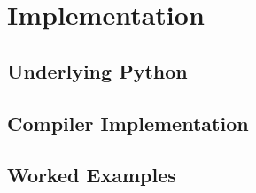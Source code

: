 \chapter{Implementation}\label{ch:ch2label}

\section{Underlying Python}\label{sec:underlying-python}


\section{Compiler Implementation}\label{sec:compiler-implementation}



\section{Worked Examples}\label{sec:worked-examples}
